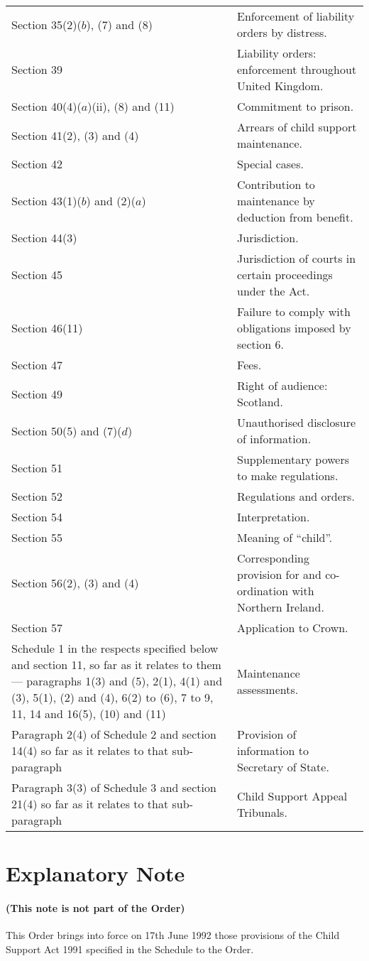 \documentclass[a4paper]{article}
\begin{document}
\begin{longtable}{p{200pt}p{121pt}}
Section 35(2)($b$), (7) and (8)&Enforcement of liability orders by distress.\\
Section 39&{Liability orders: enforcement throughout United} Kingdom.\\
Section 40(4)($a$)(ii), (8) and (11)&Commitment to prison.\\
Section 41(2), (3) and (4)&{Arrears of child support} maintenance.\\
Section 42&Special cases.\\
Section 43(1)($b$) and (2)($a$)&Contribution to maintenance by deduction from benefit.\\
Section 44(3)&Jurisdiction.\\
Section 45&Jurisdiction of courts in certain proceedings under the Act.\\
Section 46(11)&Failure to comply with obligations imposed by section 6.\\
Section 47&Fees.\\
Section 49&Right of audience: Scotland.\\
Section 50(5) and (7)($d$)&Unauthorised disclosure of information.\\
Section 51&Supplementary powers to make regulations.\\
Section 52&Regulations and orders.\\
Section 54&Interpretation.\\
Section 55&Meaning of “child”.\\
Section 56(2), (3) and (4)&{Corresponding provision} for and co-\hspace{0pt}ordination with Northern Ireland.\\
Section 57&Application to Crown.\\
Schedule 1 in the respects specified below and section 11, so far as it relates to them— paragraphs 1(3) and (5), 2(1), 4(1) and (3), 5(1), (2) and (4), 6(2) to (6), 7 to 9, 11, 14 and 16(5), (10) and (11)&Maintenance assessments.\\
Paragraph 2(4) of Schedule 2 and section 14(4) so far as it relates to that sub-paragraph&Provision of information to Secretary of State.\\
Paragraph 3(3) of Schedule 3 and section 21(4) so far as it relates to that sub-paragraph&Child Support Appeal Tribunals.\\
\end{longtable}

\part{Explanatory Note}

\subsection*{(This note is not part of the Order)}

 This Order brings into force on 17th June 1992 those provisions of the Child Support Act 1991 specified in the Schedule to the Order.
\end{document}
